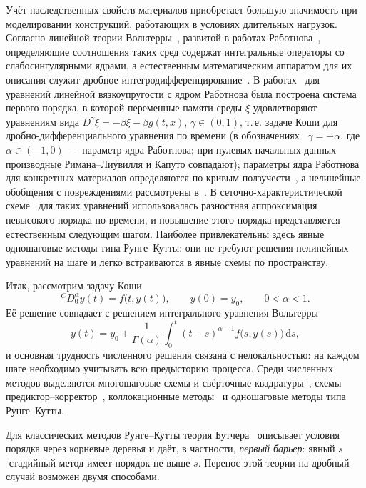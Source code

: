 \documentclass[11pt,a4paper]{article}
\theoremstyle{plain}
\theoremstyle{definition}
\newcommand{\G}{\Gamma}
\newcommand{\dd}{\,\mathrm{d}}
\begin{document}
Учёт наследственных свойств материалов приобретает большую значимость при моделировании конструкций, работающих в условиях длительных нагрузок. Согласно линейной теории Вольтерры~\cite{Volterra1982}, развитой в работах Работнова~\cite{Rabotnov1966,Rabotnov1977}, определяющие соотношения таких сред содержат интегральные операторы со слабосингулярными ядрами, а естественным математическим аппаратом для их описания служит дробное интегродифференцирование~\cite{SKM1987,Uchaikin2008,Diethelm2010}. В работах~\cite{PPKh2024,PP2026zhvm} для уравнений линейной вязкоупругости с ядром Работнова была построена система первого порядка, в которой переменные памяти среды $\xi$ удовлетворяют уравнениям вида $D^{\gamma}\xi=-\beta\xi-\beta g(t,x)$, $\gamma\in(0,1)$, т.\,е. задаче Коши для дробно-дифференциального уравнения по времени (в обозначениях~\cite{PP2026zhvm} $\gamma=-\alpha$, где $\alpha\in(-1,0)$~--- параметр ядра Работнова; при нулевых начальных данных производные Римана--Лиувилля и Капуто совпадают); параметры ядра Работнова для конкретных материалов определяются по кривым ползучести~\cite{PP2025ljm}, а нелинейные обобщения с повреждениями рассмотрены в~\cite{Prik2026sibzhim}. В сеточно-характеристической схеме~\cite{PP2026zhvm} для таких уравнений использовалась разностная аппроксимация невысокого порядка по времени, и повышение этого порядка представляется естественным следующим шагом. Наиболее привлекательны здесь явные одношаговые методы типа Рунге--Кутты: они не требуют решения нелинейных уравнений на шаге и легко встраиваются в явные схемы по пространству.

Итак, рассмотрим задачу Коши
\begin{equation}\label{eq:fde}
{}^{C}\!D^{\alpha}_{0}y(t)=f\bigl(t,y(t)\bigr),\qquad y(0)=y_0,\qquad 0<\alpha<1.
\end{equation}
Её решение совпадает с решением интегрального уравнения Вольтерры
\begin{equation}\label{eq:volterra}
y(t)=y_0+\frac{1}{\G(\alpha)}\int_0^t (t-s)^{\alpha-1}f\bigl(s,y(s)\bigr)\dd s ,
\end{equation}
и основная трудность численного решения связана с нелокальностью: на каждом шаге необходимо учитывать всю предысторию процесса. Среди численных методов выделяются многошаговые схемы и свёрточные квадратуры~\cite{Lubich1985,LubichOstermann1993,BanjaiLopez2018}, схемы предиктор--корректор~\cite{DFF2002}, коллокационные методы~\cite{Brunner2004} и одношаговые методы типа Рунге--Кутты.

Для классических методов Рунге--Кутты теория Бутчера~\cite{Butcher2016,HNW1993} описывает условия порядка через корневые деревья и даёт, в частности, \emph{первый барьер}: явный $s$-стадийный метод имеет порядок не выше $s$. Перенос этой теории на дробный случай возможен двумя способами.
\end{document}
